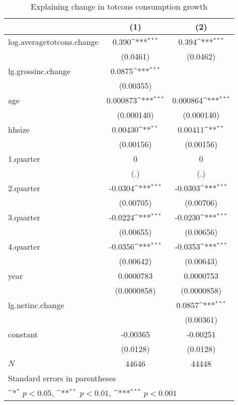 \begin{table}[htbp]\centering
\def\sym#1{\ifmmode^{#1}\else\(^{#1}\)\fi}
\caption{\label{tab:logtotcons-deltacons} Explaining change in totcons consumption growth}
\begin{tabular}{l*{2}{c}}
\hline\hline
            &\multicolumn{1}{c}{(1)}         &\multicolumn{1}{c}{(2)}         \\
\hline
log.averagetotcons.change&       0.390\sym{***}&       0.394\sym{***}\\
            &    (0.0461)         &    (0.0462)         \\
lg.grossinc.change&      0.0875\sym{***}&                     \\
            &   (0.00355)         &                     \\
age         &    0.000873\sym{***}&    0.000864\sym{***}\\
            &  (0.000140)         &  (0.000140)         \\
hhsize      &     0.00430\sym{**} &     0.00411\sym{**} \\
            &   (0.00156)         &   (0.00156)         \\
1.quarter   &           0         &           0         \\
            &         (.)         &         (.)         \\
2.quarter   &     -0.0304\sym{***}&     -0.0303\sym{***}\\
            &   (0.00705)         &   (0.00706)         \\
3.quarter   &     -0.0224\sym{***}&     -0.0230\sym{***}\\
            &   (0.00655)         &   (0.00656)         \\
4.quarter   &     -0.0356\sym{***}&     -0.0353\sym{***}\\
            &   (0.00642)         &   (0.00643)         \\
year        &   0.0000783         &   0.0000753         \\
            & (0.0000858)         & (0.0000858)         \\
lg.netinc.change&                     &      0.0857\sym{***}\\
            &                     &   (0.00361)         \\
constant    &    -0.00365         &    -0.00251         \\
            &    (0.0128)         &    (0.0128)         \\
\hline
\(N\)       &       44646         &       44448         \\
\hline\hline
\multicolumn{3}{l}{\footnotesize Standard errors in parentheses}\\
\multicolumn{3}{l}{\footnotesize \sym{*} \(p<0.05\), \sym{**} \(p<0.01\), \sym{***} \(p<0.001\)}\\
\end{tabular}
\end{table}

